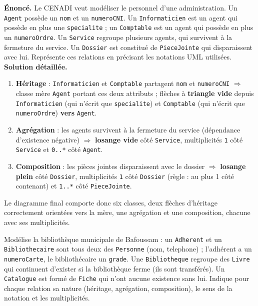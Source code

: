 \documentclass[11pt]{article}
\begin{document}
\begin{exoresolu}
\textbf{Énoncé.} Le CENADI veut modéliser le personnel d'une administration. Un \texttt{Agent} possède un \texttt{nom} et un \texttt{numeroCNI}. Un \texttt{Informaticien} est un agent qui possède en plus une \texttt{specialite} ; un \texttt{Comptable} est un agent qui possède en plus un \texttt{numeroOrdre}. Un \texttt{Service} regroupe plusieurs agents, qui survivent à la fermeture du service. Un \texttt{Dossier} est constitué de \texttt{PieceJointe} qui disparaissent avec lui. Représente ces relations en précisant les notations UML utilisées.
\tcblower
\textbf{Solution détaillée.}
\begin{enumerate}
  \item \textbf{Héritage} : \texttt{Informaticien} et \texttt{Comptable} partagent \texttt{nom} et \texttt{numeroCNI} $\Rightarrow$ classe mère \texttt{Agent} portant ces deux attributs ; flèches à \textbf{triangle vide} depuis \texttt{Informaticien} (qui n'écrit que \texttt{specialite}) et \texttt{Comptable} (qui n'écrit que \texttt{numeroOrdre}) \textbf{vers} \texttt{Agent}.
  \item \textbf{Agrégation} : les agents survivent à la fermeture du service (dépendance d'existence négative) $\Rightarrow$ \textbf{losange vide} côté \texttt{Service}, multiplicités \texttt{1} côté \texttt{Service} et \texttt{0..*} côté \texttt{Agent}.
  \item \textbf{Composition} : les pièces jointes disparaissent avec le dossier $\Rightarrow$ \textbf{losange plein} côté \texttt{Dossier}, multiplicités \texttt{1} côté \texttt{Dossier} (règle : au plus 1 côté contenant) et \texttt{1..*} côté \texttt{PieceJointe}.
\end{enumerate}
Le diagramme final comporte donc six classes, deux flèches d'héritage correctement orientées vers la mère, une agrégation et une composition, chacune avec ses multiplicités.
\end{exoresolu}

\begin{exercice}
Modélise la bibliothèque municipale de Bafoussam : un \texttt{Adherent} et un \texttt{Bibliothecaire} sont tous deux des \texttt{Personne} (nom, telephone) ; l'adhérent a un \texttt{numeroCarte}, le bibliothécaire un \texttt{grade}. Une \texttt{Bibliotheque} regroupe des \texttt{Livre} qui continuent d'exister si la bibliothèque ferme (ils sont transférés). Un \texttt{Catalogue} est formé de \texttt{Fiche} qui n'ont aucune existence sans lui. Indique pour chaque relation sa nature (héritage, agrégation, composition), le sens de la notation et les multiplicités.
\end{exercice}
\end{document}
